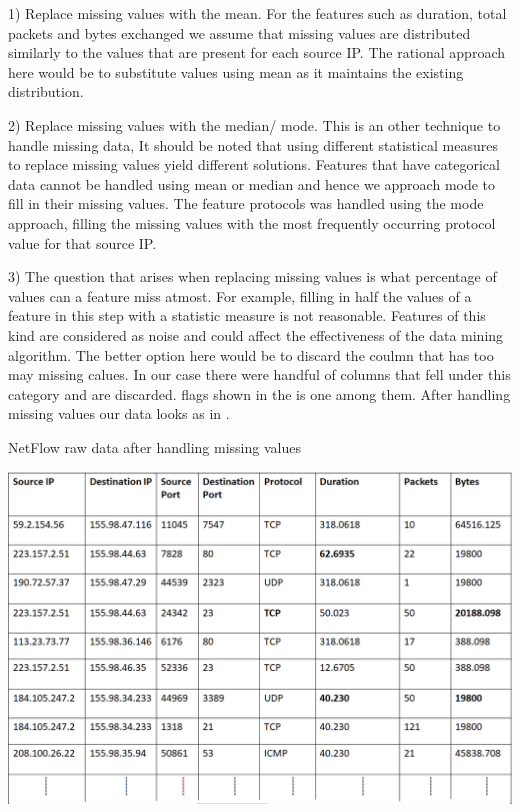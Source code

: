 1) Replace missing values with the mean. For the features such as duration, total packets and bytes exchanged we assume that missing values are distributed similarly to the values that are present for each source IP. The rational approach here would be to substitute values using mean as it maintains the existing distribution.

2) Replace missing values with the median/ mode. This is an other technique to handle missing data, It should be noted that using different statistical measures to replace missing values yield different solutions. Features that have categorical data cannot be handled using mean or median and hence we approach mode to fill in their missing values. The feature protocols was handled using the mode approach, filling the missing values with the most frequently occurring protocol value for that source IP.

3) The question that arises when replacing missing values is what percentage of values can a feature miss atmost. For example, filling in half the values of a feature in this step with a statistic measure is not reasonable. Features of this kind are considered as noise and could affect the effectiveness of the data mining algorithm. The better option here would be to discard the coulmn that has too may missing calues. In our case there were handful of columns that fell under this category and are discarded. flags shown in the  is one among them. After handling missing values our data looks as in .

\begin{table}[t]
	\caption{NetFlow raw data after handling missing values}%
	\centerline{\includegraphics[scale = 0.6]{missing_data.png}}
	
\end{table}



